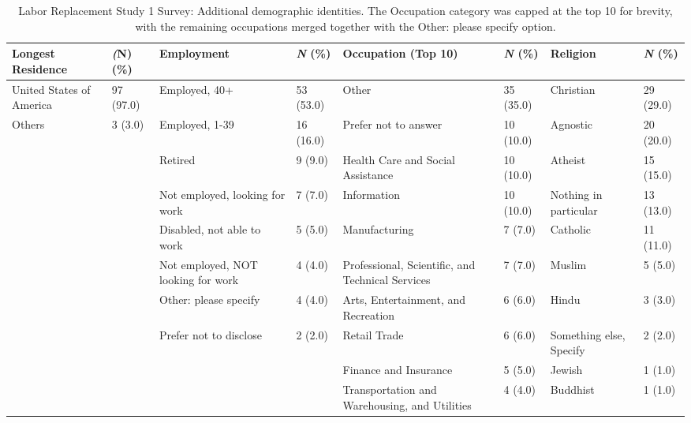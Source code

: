 \begin{table*}[htpb]
    \centering
    \footnotesize
    \begin{tabularx}{\textwidth}{Xl|Xl|Xl|Xl}
    \toprule
    \textbf{Longest Residence} & \textbf{\textit(N) (\%)} & \textbf{Employment} & \textbf{\textit{N} (\%)} & \textbf{Occupation (Top 10)} & \textbf{\textit{N} (\%)} & \textbf{Religion} & \textbf{\textit{N} (\%)} \\
    \midrule
United States of America & 97 (97.0) & Employed, 40+ & 53 (53.0) & Other & 35 (35.0) & Christian & 29 (29.0)\\
Others & 3 (3.0) & Employed, 1-39 & 16 (16.0) & Prefer not to answer & 10 (10.0) & Agnostic & 20 (20.0)\\
 &  & Retired & 9 (9.0) & Health Care and Social Assistance & 10 (10.0) & Atheist & 15 (15.0)\\
 &  & Not employed, looking for work & 7 (7.0) & Information & 10 (10.0) & Nothing in particular & 13 (13.0)\\
 &  & Disabled, not able to work & 5 (5.0) & Manufacturing & 7 (7.0) & Catholic & 11 (11.0)\\
 &  & Not employed, NOT looking for work & 4 (4.0) & Professional, Scientific, and Technical Services & 7 (7.0) & Muslim & 5 (5.0)\\
 &  & Other: please specify & 4 (4.0) & Arts, Entertainment, and Recreation & 6 (6.0) & Hindu & 3 (3.0)\\
 &  & Prefer not to disclose & 2 (2.0) & Retail Trade & 6 (6.0) & Something else, Specify & 2 (2.0)\\
 &  &  &  & Finance and Insurance & 5 (5.0) & Jewish & 1 (1.0)\\
 &  &  &  & Transportation and Warehousing, and Utilities & 4 (4.0) & Buddhist & 1 (1.0)\\
 \bottomrule
    \end{tabularx}
    \caption{Labor Replacement Study 1 Survey: Additional demographic identities. The Occupation category was capped at the top 10 for brevity, with the remaining occupations merged together with the Other: please specify option.}
    \label{app:demographics-3-jobs-p1}
\end{table*}